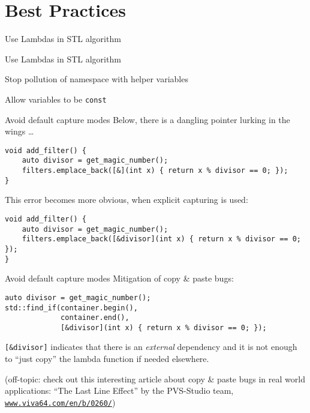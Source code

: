 \begin{frame}
    \centering
    \scalebox{3}{Best Practices}

\end{frame}

\section{Best Practices}

\begin{frame}[fragile]{Use Lambdas in STL algorithm}
\end{frame}

\begin{frame}[fragile]{Use Lambdas in STL algorithm}
\end{frame}

\begin{frame}[fragile]{Stop pollution of namespace with helper variables}
\end{frame}

\begin{frame}[fragile]{Allow variables to be \texttt{const}}
\end{frame}

\begin{frame}[fragile]{Avoid default capture modes}
    Below, there is a dangling pointer lurking in the wings \ldots
    \begin{lstlisting}
void add_filter() {
    auto divisor = get_magic_number();
    filters.emplace_back([&](int x) { return x % divisor == 0; });
}
    \end{lstlisting}

    This error becomes more obvious, when explicit capturing is used:
    \begin{lstlisting}
void add_filter() {
    auto divisor = get_magic_number();
    filters.emplace_back([&divisor](int x) { return x % divisor == 0; });
}
    \end{lstlisting}
\end{frame}

\begin{frame}[fragile]{Avoid default capture modes}
    Mitigation of copy \& paste bugs:
    \begin{lstlisting}
auto divisor = get_magic_number();
std::find_if(container.begin(),
             container.end(),
             [&divisor](int x) { return x % divisor == 0; });
    \end{lstlisting}

    \texttt{[\&divisor]} indicates that there is an \textit{external} dependency and it is not enough to \enquote{just copy} the lambda function if needed elsewhere.

    {\footnotesize (off-topic: check out this interesting article about copy \& paste bugs in real world applications: \enquote{The Last Line Effect} by the PVS-Studio team, \href{https://www.viva64.com/en/b/0260/}{\texttt{www.viva64.com/en/b/0260/}})}  
\end{frame}

